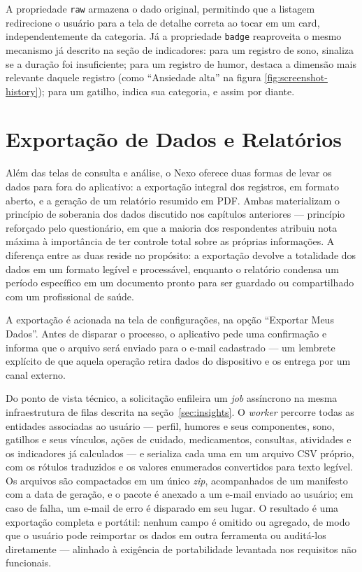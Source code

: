A propriedade \texttt{raw} armazena o dado original, permitindo que a
listagem redirecione o usuário para a tela de detalhe correta ao tocar em
um card, independentemente da categoria. Já a propriedade \texttt{badge}
reaproveita o mesmo mecanismo já descrito na seção de indicadores: para
um registro de sono, sinaliza se a duração foi insuficiente; para um
registro de humor, destaca a dimensão mais relevante daquele registro
(como ``Ansiedade alta'' na figura \ref{fig:screenshot-history}); para um
gatilho, indica sua categoria, e assim por diante.

\section{Exportação de Dados e Relatórios}\label{sec:export-report}

Além das telas de consulta e análise, o Nexo oferece duas formas de
levar os dados para fora do aplicativo: a exportação integral dos
registros, em formato aberto, e a geração de um relatório resumido em
PDF. Ambas materializam o princípio de soberania dos dados discutido nos
capítulos anteriores --- princípio reforçado pelo questionário, em que a
maioria dos respondentes atribuiu nota máxima à importância de ter
controle total sobre as próprias informações. A diferença entre as duas
reside no propósito: a exportação devolve a totalidade dos dados em um
formato legível e processável, enquanto o relatório condensa um período
específico em um documento pronto para ser guardado ou compartilhado com
um profissional de saúde.

A exportação é acionada na tela de configurações, na opção ``Exportar
Meus Dados''. Antes de disparar o processo, o aplicativo pede uma
confirmação e informa que o arquivo será enviado para o e-mail cadastrado
--- um lembrete explícito de que aquela operação retira dados do
dispositivo e os entrega por um canal externo.


Do ponto de vista técnico, a solicitação enfileira um \textit{job}
assíncrono na mesma infraestrutura de filas descrita na
seção~\ref{sec:insights}. O \textit{worker} percorre todas as entidades
associadas ao usuário --- perfil, humores e seus componentes, sono,
gatilhos e seus vínculos, ações de cuidado, medicamentos, consultas,
atividades e os indicadores já calculados --- e serializa cada uma em um
arquivo CSV próprio, com os rótulos traduzidos e os valores enumerados
convertidos para texto legível. Os arquivos são compactados em um único
\textit{zip}, acompanhados de um manifesto com a data de geração, e o
pacote é anexado a um e-mail enviado ao usuário; em caso de falha, um
e-mail de erro é disparado em seu lugar. O resultado é uma exportação
completa e portátil: nenhum campo é omitido ou agregado, de modo que o
usuário pode reimportar os dados em outra ferramenta ou auditá-los
diretamente --- alinhado à exigência de portabilidade levantada nos
requisitos não funcionais.

